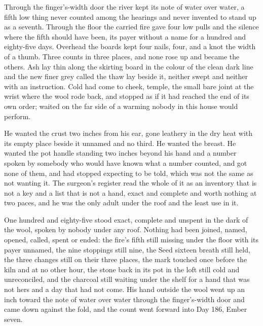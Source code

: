 \scenebreak

Through the finger's-width door the river kept its note of water over water, a fifth low thing never counted among the hearings and never invented to stand up as a seventh. Through the floor the carried fire gave four low pulls and the silence where the fifth should have been, its payer without a name for a hundred and eighty-five days. Overhead the boards kept four nails, four, and a knot the width of a thumb. Three counts in three places, and none rose up and became the others. Ash lay thin along the skirting board in the colour of the clean dark line and the new finer grey called the thaw lay beside it, neither swept and neither with an instruction. Cold had come to cheek, temple, the small bare joint at the wrist where the wool rode back, and stopped as if it had reached the end of its own order;  waited on the far side of a warming nobody in this house would perform.

He wanted the crust two inches from his ear, gone leathery in the dry heat with its empty place beside it unnamed and no third. He wanted the breast. He wanted the pot handle standing two inches beyond his hand and a number spoken by somebody who would have known what a number counted, and got none of them, and had stopped expecting to be told, which was not the same as not wanting it. The surgeon's register read the whole of it as an inventory that is not a key and a list that is not a hand, exact and complete and worth nothing at two paces, and he was the only adult under the roof and the least use in it.

One hundred and eighty-five stood exact, complete and unspent in the dark of the wool, spoken by nobody under any roof. Nothing had been joined, named, opened, called, spent or ended: the fire's fifth still missing under the floor with its payer unnamed, the nine stoppings still nine, the Seed sixteen breath still held, the three changes still on their three places, the mark touched once before the kiln and at no other hour, the stone back in its pot in the loft still cold and unreconciled, and the charcoal still waiting under the shelf for a hand that was not hers and a day that had not come. His hand outside the wool went up an inch toward the note of water over water through the finger's-width door and came down against the fold, and the count went forward into Day 186, Ember seven.
